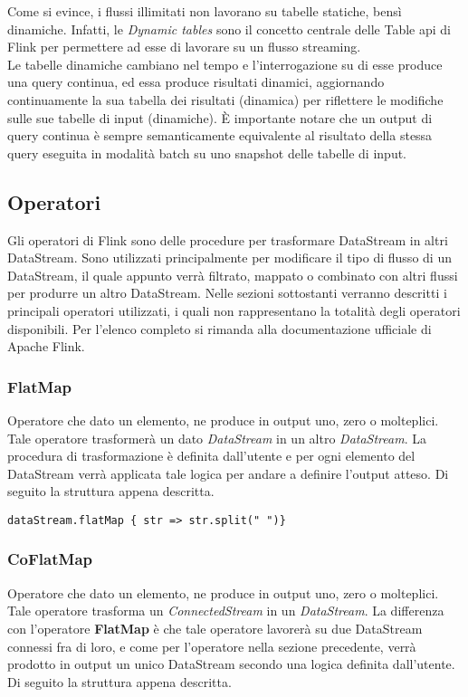Come si evince, i flussi illimitati non lavorano su tabelle statiche, bensì dinamiche. Infatti, le \textit{Dynamic tables} sono il concetto centrale delle Table \gls{api} di Flink per permettere ad esse di lavorare su un flusso streaming.\\
Le tabelle dinamiche cambiano nel tempo e l'interrogazione su di esse produce una query continua, ed essa produce risultati dinamici, aggiornando continuamente la sua tabella dei risultati (dinamica) per riflettere le modifiche sulle sue tabelle di input (dinamiche). È importante notare che un output di query continua è sempre semanticamente equivalente al risultato della stessa query eseguita in modalità batch su uno snapshot delle tabelle di input.



\subsection{Operatori}\label{sec:operatori}
Gli operatori di Flink sono delle procedure per trasformare DataStream in altri DataStream. Sono utilizzati principalmente per modificare il tipo di flusso di un DataStream, il quale appunto verrà filtrato, mappato o combinato con altri flussi per produrre un altro DataStream. Nelle sezioni sottostanti verranno descritti i principali operatori utilizzati, i quali non rappresentano la totalità degli operatori disponibili. Per l'elenco completo si rimanda alla documentazione ufficiale di Apache Flink.

\subsubsection{FlatMap}
Operatore che dato un elemento, ne produce in output uno, zero o molteplici. Tale operatore trasformerà un dato \textit{DataStream} in un altro \textit{DataStream}. La procedura di trasformazione è definita dall'utente e per ogni elemento del DataStream verrà applicata tale logica per andare a definire l'output atteso. Di seguito la struttura appena descritta.

\begin{verbatim}
dataStream.flatMap { str => str.split(" ")}
\end{verbatim}
	
	
\subsubsection{CoFlatMap}
Operatore che dato un elemento, ne produce in output uno, zero o molteplici. Tale operatore trasforma un \textit{ConnectedStream} in un \textit{DataStream}. La differenza con l'operatore \textbf{FlatMap} è che tale operatore lavorerà su due DataStream connessi fra di loro, e come per l'operatore nella sezione precedente, verrà prodotto in output un unico DataStream secondo una logica definita dall'utente. Di seguito la struttura appena descritta.

